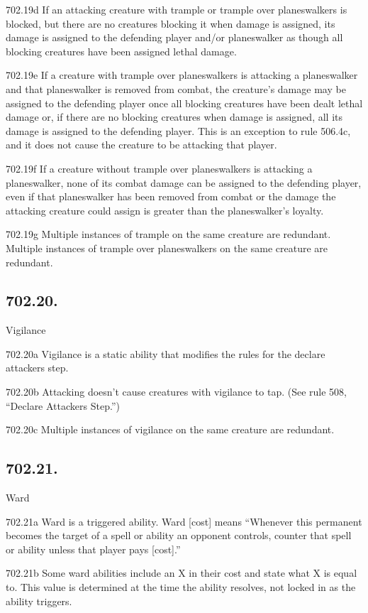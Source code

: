 702.19d If an attacking creature with trample or trample over planeswalkers is blocked, but there are no creatures blocking it when damage is assigned, its damage is assigned to the defending player and/or planeswalker as though all blocking creatures have been assigned lethal damage.

702.19e If a creature with trample over planeswalkers is attacking a planeswalker and that planeswalker is removed from combat, the creature’s damage may be assigned to the defending player once all blocking creatures have been dealt lethal damage or, if there are no blocking creatures when damage is assigned, all its damage is assigned to the defending player. This is an exception to rule 506.4c, and it does not cause the creature to be attacking that player.

702.19f If a creature without trample over planeswalkers is attacking a planeswalker, none of its combat damage can be assigned to the defending player, even if that planeswalker has been removed from combat or the damage the attacking creature could assign is greater than the planeswalker’s loyalty.

702.19g Multiple instances of trample on the same creature are redundant. Multiple instances of trample over planeswalkers on the same creature are redundant.

\subsection*{702.20.}
Vigilance

702.20a Vigilance is a static ability that modifies the rules for the declare attackers step.

702.20b Attacking doesn’t cause creatures with vigilance to tap. (See rule 508, “Declare Attackers Step.”)

702.20c Multiple instances of vigilance on the same creature are redundant.

\subsection*{702.21.}
Ward

702.21a Ward is a triggered ability. Ward [cost] means “Whenever this permanent becomes the target of a spell or ability an opponent controls, counter that spell or ability unless that player pays [cost].”

702.21b Some ward abilities include an X in their cost and state what X is equal to. This value is determined at the time the ability resolves, not locked in as the ability triggers.

